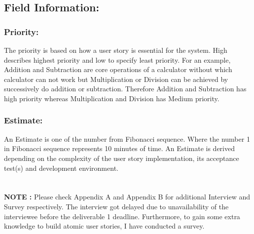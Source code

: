 \documentclass{article}
\newcommand\tab[1][1cm]{\hspace*{#1}}
\begin{document}
\subsection{Field Information:}
\subsubsection{Priority: }
\tab[1.2cm] The priority is based on how a user story is essential for the system. High describes highest priority and low to specify least priority.
For an example, Addition and Subtraction are core operations of a calculator without which calculator can not work but Multiplication or Division can be achieved by successively do addition or subtraction. Therefore Addition and Subtraction has high priority whereas Multiplication and Division has Medium priority.
\subsubsection{Estimate: }
\tab[1.2cm] An Estimate is one of the number from Fibonacci sequence. Where the number 1 in Fibonacci sequence represents 10 minutes of time. An Estimate is derived depending on the complexity of the user story implementation, its acceptance test(s) and development environment. 
\\ \\ \\
\noindent
\textbf{NOTE : } Please check Appendix A and Appendix B for additional Interview and Survey respectively. The interview got delayed due to unavailability of the interviewee before the deliverable 1 deadline. Furthermore, to gain some extra knowledge to build atomic user stories, I have conducted a survey. 
\newpage
\end{document}
